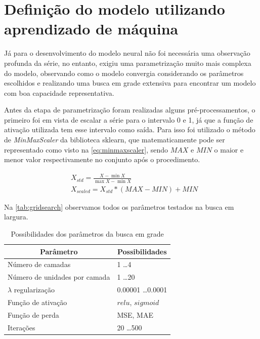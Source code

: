 \documentclass[
    12pt,
    oneside,
    a4paper,
    english,
    brazil
]{abntex2}
\begin{document}
\section{Definição do modelo utilizando aprendizado de máquina}

Já para  o desenvolvimento do modelo  neural não foi necessária  uma observação
profunda da  série, no entanto,  exigiu uma parametrização muito  mais complexa
do  modelo,  observando como  o  modelo  convergia considerando  os  parâmetros
escolhidos e realizando  uma busca em grade extensiva para  encontrar um modelo
com boa capacidade representativa.

Antes da etapa de parametrização  foram realizadas alguns pré-processamentos, o
primeiro foi  em vista  de escalar a  série para o  intervalo 0  e 1, já  que a
função  de  ativação  utilizada  tem  esse  intervalo  como  saída.  Para  isso
foi  utilizado o  método de  \textit{MinMaxScaler} da  biblioteca sklearn,  que
matematicamente pode ser representado  como visto na \autoref{eq:minmaxscaler},
sendo $MAX$ e  $MIN$ o maior e  menor valor respectivamente no  conjunto após o
procedimento.

\begin{equation}
    \begin{split}\label{eq:minmaxscaler}
        &X_{std} = \frac{X - \min X}{\max X-\min X}\\
        &X_{scaled} = X_{std} * (MAX-MIN)+MIN
    \end{split}
\end{equation}

Na \autoref{tab:gridsearch} observamos todos os parâmetros testados na busca em
largura.

\begin{table}[ht]
\centering
\caption{Possibilidades dos parâmetros da busca em grade}\label{tab:gridsearch}
\begin{tabular}{l l}
\multicolumn{1}{c}{Parâmetro}        & \multicolumn{1}{c}{Possibilidades}  \\
    \toprule
    Número de camadas                & 1 \ldots 4                          \\
    Número de unidades por camada    & 1 \ldots 20                         \\
    $\lambda$ regularização          & 0.00001 \ldots 0.0001               \\
    Função de ativação               & $relu$, $sigmoid$                   \\
    Função de perda                  & MSE, MAE                            \\
    Iterações                        & 20 \ldots 500
\end{tabular}
\end{table}
\end{document}
